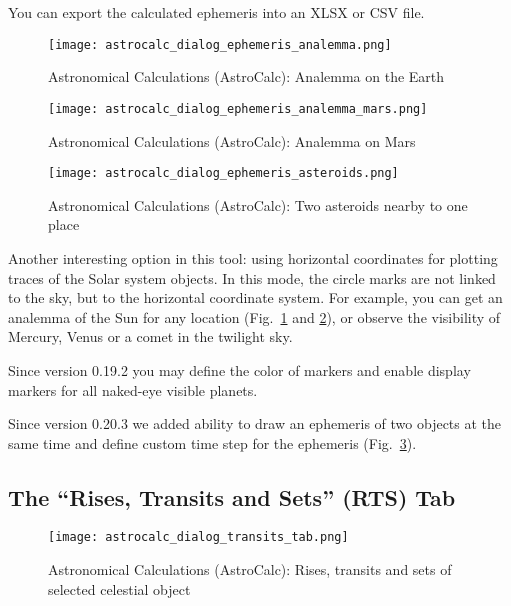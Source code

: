 You can export the calculated ephemeris into an XLSX or CSV file. 

\begin{figure}[tbp]
	\centering\texttt{[image: astrocalc\_dialog\_ephemeris\_analemma.png]}
	\caption{Astronomical Calculations (AstroCalc): Analemma on the Earth}
	\label{fig:gui:AstroCalc:Ephemeris:Analemma}
\end{figure}

\begin{figure}[p]
	\centering\texttt{[image: astrocalc\_dialog\_ephemeris\_analemma\_mars.png]}
	\caption{Astronomical Calculations (AstroCalc): Analemma on Mars}
	\label{fig:gui:AstroCalc:Ephemeris:AnalemmaMars}
\end{figure}

\begin{figure}[p]
	\centering\texttt{[image: astrocalc\_dialog\_ephemeris\_asteroids.png]}
	\caption{Astronomical Calculations (AstroCalc): Two asteroids nearby to one place}
	\label{fig:gui:AstroCalc:Ephemeris:Asteroids}
\end{figure}

Another interesting option in this tool: using horizontal coordinates for plotting traces of the Solar system objects. 
In this mode, the circle marks are not linked to the sky, but to the horizontal coordinate system.
For example, you can get an analemma of the Sun for any location (Fig.~\ref{fig:gui:AstroCalc:Ephemeris:Analemma}
and \ref{fig:gui:AstroCalc:Ephemeris:AnalemmaMars}), 
or observe the visibility of Mercury, Venus or a comet in the twilight sky.

Since version 0.19.2 you may define the color of markers and 
enable display markers for all naked-eye visible planets.

Since version 0.20.3 we added ability to draw an ephemeris of 
two objects at the same time and define custom time step for the ephemeris 
(Fig.~\ref{fig:gui:AstroCalc:Ephemeris:Asteroids}).

\subsection{The ``Rises, Transits and Sets'' (RTS) Tab}
\label{sec:gui:AstroCalc:RTS}

\begin{figure}[htbp]
	\centering\texttt{[image: astrocalc\_dialog\_transits\_tab.png]}
	\caption{Astronomical Calculations (AstroCalc): Rises, transits and sets of selected celestial object}
	\label{fig:gui:AstroCalc:RTS}
\end{figure}

